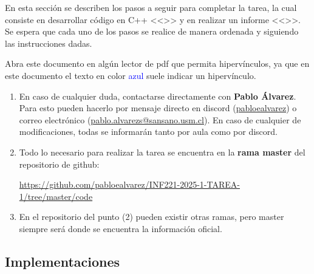 En esta sección se describen los pasos a seguir para completar la tarea, la cual consiste en desarrollar código en C++ <<>> y en realizar un informe <<>>. Se espera que cada uno de los pasos se realice de manera ordenada y siguiendo las instrucciones dadas.

\begin{mdframed}
    Abra este documento en algún lector de pdf que permita hipervínculos, ya que en este documento el texto en color \textcolor{blue}{azul} suele indicar un hipervínculo.
\end{mdframed}

\begin{enumerate}[(1)]
    \item 
    En caso de cualquier duda, contactarse directamente con \textbf{Pablo Álvarez}. Para esto pueden hacerlo por mensaje directo en discord (\url{pabloealvarez}) o correo electrónico (\url{pablo.alvarezs@sansano.usm.cl}). En caso de cualquier de modificaciones, todas se informarán tanto por aula como por discord.
    \item Todo lo necesario para realizar la tarea se encuentra en la \textbf{rama master} del repositorio de github:
\begin{center}

    \url{https://github.com/pabloealvarez/INF221-2025-1-TAREA-1/tree/master/code}
        
\end{center}
\item En el repositorio del punto (2) pueden existir otras ramas, pero master siempre será donde se encuentra la información oficial.
\end{enumerate}

\subsection{Implementaciones} \label{subsec:implementations}




